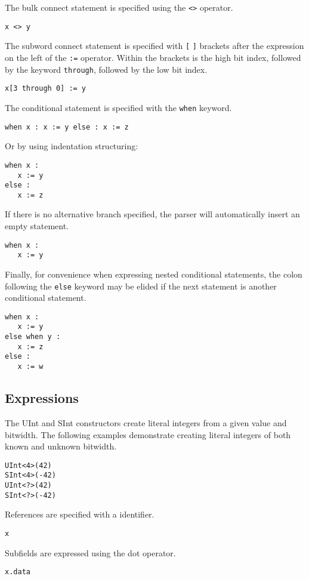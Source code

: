 \documentclass[10pt]{article}
\begin{document}
The bulk connect statement is specified using the \verb|<>| operator.
\begin{verbatim}
x <> y
\end{verbatim}

The subword connect statement is specified with \verb|[| \verb|]| brackets after the expression on the left of the \verb|:=| operator. Within the brackets is the high bit index, followed by the keyword \verb|through|, followed by the low bit index.
\begin{verbatim}
x[3 through 0] := y
\end{verbatim}

The conditional statement is specified with the \verb|when| keyword.
\begin{verbatim}
when x : x := y else : x := z
\end{verbatim}
Or by using indentation structuring:
\begin{verbatim}
when x :
   x := y
else :
   x := z
\end{verbatim}

If there is no alternative branch specified, the parser will automatically insert an empty statement.
\begin{verbatim}
when x :
   x := y
\end{verbatim}

Finally, for convenience when expressing nested conditional statements, the colon following the \verb|else| keyword may be elided if the next statement is another conditional statement.
\begin{verbatim}
when x :
   x := y
else when y :
   x := z
else :
   x := w
\end{verbatim}

\subsection*{Expressions}

The UInt and SInt constructors create literal integers from a given value and bitwidth.
The following examples demonstrate creating literal integers of both known and unknown bitwidth.
\begin{verbatim}
UInt<4>(42)
SInt<4>(-42)
UInt<?>(42)
SInt<?>(-42)
\end{verbatim}

References are specified with a identifier.
\begin{verbatim}
x
\end{verbatim}

Subfields are expressed using the dot operator.
\begin{verbatim}
x.data
\end{verbatim}
\end{document}
